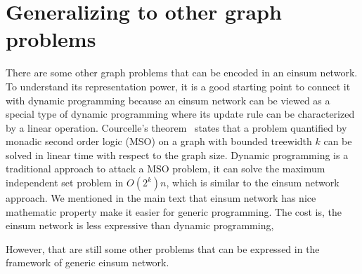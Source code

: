 \documentclass[review,onefignum,onetabnum]{siamart190516}
\newcommand{\<}{\langle}
\renewcommand{\>}{\rangle}
\newcommand{\Eq}[1]{Eq.~(\ref{#1})}
\newcounter{example}
\begin{document}
\section{Generalizing to other graph problems}
There are some other graph problems that can be encoded in an einsum network.
To understand its representation power, it is a good starting point to connect it with dynamic programming because
an einsum network can be viewed as a special type of dynamic programming where its update rule can be characterized by a linear operation.
Courcelle’s theorem~\cite{Courcelle1990,Barr2020} states that a problem quantified by monadic second order logic (MSO) on a graph with bounded treewidth $k$ can be solved in linear time with respect to the graph size.
Dynamic programming is a traditional approach to attack a MSO problem, it can solve the maximum independent set problem in $O(2^k)n$, which is similar to the einsum network approach.
We mentioned in the main text that einsum network has nice mathematic property make it easier for generic programming.
The cost is, the einsum network is less expressive than dynamic programming,

However, that are still some other problems that can be expressed in the framework of generic einsum network.
\end{document}
